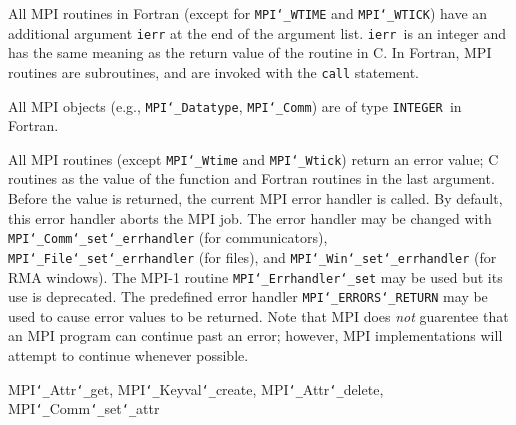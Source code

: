 \par
{}
All MPI routines in Fortran (except for {\tt MPI{\tt \char`\_}WTIME} and {\tt MPI{\tt \char`\_}WTICK}) have
an additional argument {\tt ierr} at the end of the argument list.  {\tt ierr
}is an integer and has the same meaning as the return value of the routine
in C.  In Fortran, MPI routines are subroutines, and are invoked with the
{\tt call} statement.
\par
All MPI objects (e.g., {\tt MPI{\tt \char`\_}Datatype}, {\tt MPI{\tt \char`\_}Comm}) are of type {\tt INTEGER
}in Fortran.
\par
{}
\par
All MPI routines (except {\tt MPI{\tt \char`\_}Wtime} and {\tt MPI{\tt \char`\_}Wtick}) return an error value;
C routines as the value of the function and Fortran routines in the last
argument.  Before the value is returned, the current MPI error handler is
called.  By default, this error handler aborts the MPI job.  The error handler
may be changed with {\tt MPI{\tt \char`\_}Comm{\tt \char`\_}set{\tt \char`\_}errhandler} (for communicators),
{\tt MPI{\tt \char`\_}File{\tt \char`\_}set{\tt \char`\_}errhandler} (for files), and {\tt MPI{\tt \char`\_}Win{\tt \char`\_}set{\tt \char`\_}errhandler} (for
RMA windows).  The MPI-1 routine {\tt MPI{\tt \char`\_}Errhandler{\tt \char`\_}set} may be used but
its use is deprecated.  The predefined error handler
{\tt MPI{\tt \char`\_}ERRORS{\tt \char`\_}RETURN} may be used to cause error values to be returned.
Note that MPI does {\em not} guarentee that an MPI program can continue past
an error; however, MPI implementations will attempt to continue whenever
possible.
\par
{}
\par
{}
MPI{\tt \char`\_}Attr{\tt \char`\_}get, MPI{\tt \char`\_}Keyval{\tt \char`\_}create, MPI{\tt \char`\_}Attr{\tt \char`\_}delete, MPI{\tt \char`\_}Comm{\tt \char`\_}set{\tt \char`\_}attr
\nextline
{}
\endmanpage
